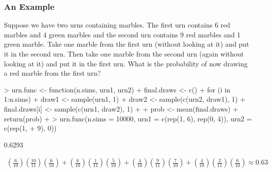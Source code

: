 \documentclass{beamer}
\begin{document}
\begin{frame}[fragile]
\frametitle{An Example}
\pause
\small
Suppose we have two urns containing marbles.  The first urn contains 6
red marbles and 4 green marbles and the second urn contains 9 red
marbles and 1 green marble.  Take one marble from the first urn
(without looking at it) and put it in the second urn.  Then take one
marble from the second urn (again without looking at it) and put it in
the first urn.  What is the probability of now drawing a red marble
from the first urn?
\pause
\medskip
\tiny
\begin{Schunk}
\begin{Sinput}
> urn.func <- function(n.sims, urn1, urn2) {
+     final.draws <- c()
+     for (i in 1:n.sims) {
+         draw1 <- sample(urn1, 1)
+         draw2 <- sample(c(urn2, draw1), 1)
+         final.draws[i] <- sample(c(urn1, draw2), 1)
+     }
+     prob <- mean(final.draws)
+     return(prob)
+ }
> urn.func(n.sims = 10000, urn1 = c(rep(1, 6), rep(0, 4)), urn2 = c(rep(1, 
+     9), 0))
\end{Sinput}
\begin{Soutput}
[1] 0.6293
\end{Soutput}
\end{Schunk}
\pause
\color{red}
\begin{eqnarray*}
\left(\frac{6}{10} \right)\left(\frac{10}{11} \right)
\left(\frac{6}{10} \right) + \left(\frac{6}{10} \right)
\left(\frac{1}{11} \right) \left(\frac{5}{10} \right) +
\left(\frac{4}{10} \right) \left(\frac{9}{11} \right)
\left(\frac{7}{10} \right) + \left(\frac{4}{10} \right)
\left(\frac{2}{11} \right) \left(\frac{6}{10} \right) \approx 0.63
\end{eqnarray*}
\color{black}
\normalsize
\end{frame}
\end{document}
